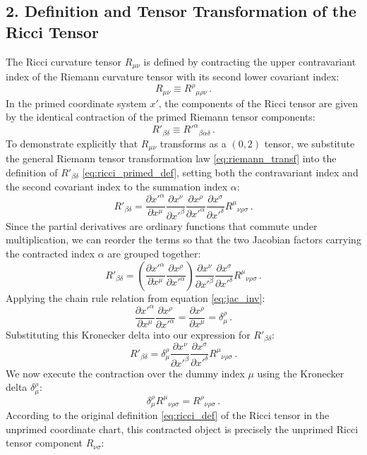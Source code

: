 \documentclass[12pt]{article}
\newcommand{\be}{\begin{equation}}
\newcommand{\ee}{\end{equation}}
\begin{document}
\subsection*{2. Definition and Tensor Transformation of the Ricci Tensor}

The Ricci curvature tensor $R_{\mu\nu}$ is defined by contracting the upper contravariant index of the Riemann curvature tensor with its second lower covariant index:
\be
R_{\mu\nu} \equiv R^\rho{}_{\mu\rho\nu} \,.
\label{eq:ricci_def}
\ee
In the primed coordinate system $x'$, the components of the Ricci tensor are given by the identical contraction of the primed Riemann tensor components:
\be
R'_{\beta\delta} \equiv R'^\alpha{}_{\beta\alpha\delta} \,.
\label{eq:ricci_primed_def}
\ee
To demonstrate explicitly that $R_{\mu\nu}$ transforms as a $(0,2)$ tensor, we substitute the general Riemann tensor transformation law \eqref{eq:riemann_transf} into the definition of $R'_{\beta\delta}$ \eqref{eq:ricci_primed_def}, setting both the contravariant index and the second covariant index to the summation index $\alpha$:
\be
R'_{\beta\delta} = \frac{\partial x'^\alpha}{\partial x^\mu} \frac{\partial x^\nu}{\partial x'^\beta} \frac{\partial x^\rho}{\partial x'^\alpha} \frac{\partial x^\sigma}{\partial x'^\delta} R^\mu{}_{\nu\rho\sigma} \,.
\ee
Since the partial derivatives are ordinary functions that commute under multiplication, we can reorder the terms so that the two Jacobian factors carrying the contracted index $\alpha$ are grouped together:
\be
R'_{\beta\delta} = \left( \frac{\partial x'^\alpha}{\partial x^\mu} \frac{\partial x^\rho}{\partial x'^\alpha} \right) \frac{\partial x^\nu}{\partial x'^\beta} \frac{\partial x^\sigma}{\partial x'^\delta} R^\mu{}_{\nu\rho\sigma} \,.
\ee
Applying the chain rule relation from equation \eqref{eq:jac_inv}:
\be
\frac{\partial x'^\alpha}{\partial x^\mu} \frac{\partial x^\rho}{\partial x'^\alpha} = \frac{\partial x^\rho}{\partial x^\mu} = \delta^\rho_\mu \,.
\ee
Substituting this Kronecker delta into our expression for $R'_{\beta\delta}$:
\be
R'_{\beta\delta} = \delta^\rho_\mu \frac{\partial x^\nu}{\partial x'^\beta} \frac{\partial x^\sigma}{\partial x'^\delta} R^\mu{}_{\nu\rho\sigma} \,.
\ee
We now execute the contraction over the dummy index $\mu$ using the Kronecker delta $\delta^\rho_\mu$:
\be
\delta^\rho_\mu R^\mu{}_{\nu\rho\sigma} = R^\rho{}_{\nu\rho\sigma} \,.
\ee
According to the original definition \eqref{eq:ricci_def} of the Ricci tensor in the unprimed coordinate chart, this contracted object is precisely the unprimed Ricci tensor component $R_{\nu\sigma}$:
\end{document}
